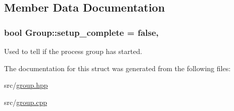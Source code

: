 \subsection{Member Data Documentation}
\subsubsection[{\texorpdfstring{setup\+\_\+complete}{setup_complete}}]{\setlength{\rightskip}{0pt plus 5cm}bool Group\+::setup\+\_\+complete = false\hspace{0.3cm}{\ttfamily [static]}, {\ttfamily [private]}}\hypertarget{struct_group_a35632ca452cfe09fbf723539cd264f58}{}\label{struct_group_a35632ca452cfe09fbf723539cd264f58}


Used to tell if the process group has started. 



The documentation for this struct was generated from the following files\+:\begin{DoxyCompactItemize}
\item 
src/\hyperlink{group_8hpp}{group.\+hpp}\item 
src/\hyperlink{group_8cpp}{group.\+cpp}\end{DoxyCompactItemize}
